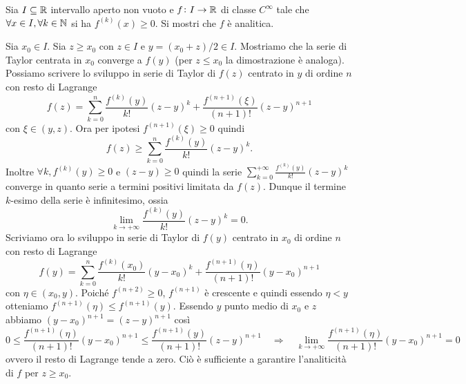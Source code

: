 \begin{es}
  Sia $ I \subseteq \mathbb{R} $ intervallo aperto non vuoto e $ f \colon I \to \mathbb{R} $ di classe $ C^{\infty} $ tale che $ \forall x \in I, \forall k \in \mathbb{N} $ si ha $ f^{(k)}(x) \geq 0 $. Si mostri che $ f $ è analitica.
\end{es}
%
Sia $ x_0 \in I $. Sia $ z \ge x_0 $ con $ z \in I $ e $ y = (x_0 + z)/2 \in I $. Mostriamo che la serie di Taylor centrata in $ x_0 $ converge a $ f(y) $ (per $ z \leq x_0 $ la dimostrazione è analoga). Possiamo scrivere lo sviluppo in serie di Taylor di $ f(z) $ centrato in $ y $ di ordine $ n $ con resto di Lagrange
\begin{equation*}
  f(z) = \sum_{k = 0}^{n} \frac{f^{(k)}(y)}{k!}(z - y)^k + \frac{f^{(n + 1)}(\xi)}{(n + 1)!}(z - y)^{n + 1}
\end{equation*}
con $ \xi \in (y, z) $. Ora per ipotesi $ f^{(n + 1)}(\xi) \geq 0 $ quindi
\begin{equation*}
  f(z) \geq \sum_{k = 0}^{n} \frac{f^{(k)}(y)}{k!}(z - y)^k.
\end{equation*}
Inoltre $ \forall k, f^{(k)}(y) \geq 0 $ e $ (z - y) \geq 0 $ quindi la serie $ \sum_{k = 0}^{+\infty} \frac{f^{(k)}(y)}{k!}(z - y)^k $ converge in quanto serie a termini positivi limitata da $ f(z) $. Dunque il termine $ k $-esimo della serie è infinitesimo, ossia
\begin{equation*}
  \lim_{k \to +\infty} \frac{f^{(k)}(y)}{k!}(z - y)^k = 0.
\end{equation*}
Scriviamo ora lo sviluppo in serie di Taylor di $ f(y) $ centrato in $ x_0 $ di ordine $ n $ con resto di Lagrange
\begin{equation*}
  f(y) = \sum_{k = 0}^{n} \frac{f^{(k)}(x_0)}{k!}(y - x_0)^k + \frac{f^{(n + 1)}(\eta)}{(n + 1)!}(y - x_0)^{n + 1}
\end{equation*}
con $ \eta \in (x_0, y) $. Poiché $ f^{(n + 2)} \geq 0 $, $ f^{(n + 1)} $ è crescente e quindi essendo $ \eta < y $ otteniamo $ f^{(n + 1)}(\eta) \leq f^{(n + 1)}(y) $. Essendo $ y $ punto medio di $ x_0 $ e $ z $ abbiamo $ (y - x_0)^{n + 1} = (z - y)^{n + 1} $ così
\begin{equation*}
  0 \leq \frac{f^{(n + 1)}(\eta)}{(n + 1)!}(y - x_0)^{n + 1} \leq \frac{f^{(n + 1)}(y)}{(n + 1)!}(z - y)^{n + 1} \quad \Rightarrow  \quad \lim_{k \to +\infty} \frac{f^{(n + 1)}(\eta)}{(n + 1)!}(y - x_0)^{n + 1} = 0
\end{equation*}
ovvero il resto di Lagrange tende a zero. Ciò è sufficiente a garantire l'analiticità di $ f $ per $ z \geq x_0 $.

